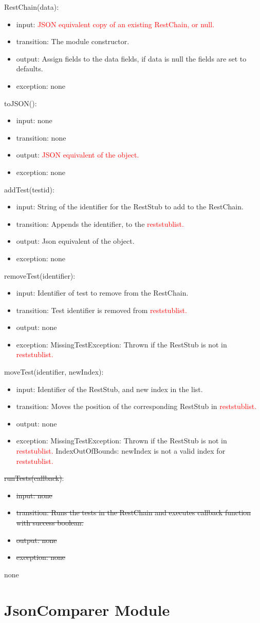 \documentclass[12pt, titlepage]{article}
\newcommand{\newAccessProgram}[5]{
	\noindent #1:
		\begin{itemize}
		    \item input: #2
			\item transition: #3
			\item output: #4
			\item exception: #5
		\end{itemize}
}
\newcommand{\oldAccessProgram}[5]{
	\noindent \sout{#1}:
		\begin{itemize}
		    \item \sout{input: #2}
			\item \sout{transition: #3}
			\item \sout{output: #4}
			\item \sout{exception: #5}
		\end{itemize}
}
\begin{document}
	{%
		\newAccessProgram{RestChain(data)}
			{%
				\textcolor{red}{JSON equivalent copy of an existing RestChain, or null.}
			}
			{%
				The module constructor.
			}
			{%
				Assign fields to the data fields, if data is null the fields are set to defaults.
			}
			{%
				none
			}
		\newAccessProgram{toJSON()}
			{%
				none
			}
			{%
				none
			}
			{%
				\textcolor{red}{JSON equivalent of the object.}
			}
			{%
				none
			}
			\newAccessProgram{addTest(testid)}
			{%
				String of the identifier for the RestStub to add to the RestChain.
			}
			{%
				Appends the identifier, to the \textcolor{red}{reststublist.}
			}
			{%
				Json equivalent of the object.
			}
			{%
				none
			}
		\newAccessProgram{removeTest(identifier)}
			{%
				Identifier of test to remove from the RestChain.
			}
			{%
				Test identifier is removed from \textcolor{red}{reststublist.}
			}
			{%
				none
			}
			{%
				MissingTestException: Thrown if the RestStub is not in \textcolor{red}{reststublist.}
			}
		\newAccessProgram{moveTest(identifier, newIndex)}
			{%
				Identifier of the RestStub, and new index in the list.
			}
			{%
				Moves the position of the corresponding RestStub in \textcolor{red}{reststublist.}
			}
			{%
				none
			}
			{%
				MissingTestException: Thrown if the RestStub is not in \textcolor{red}{reststublist.} 
				IndexOutOfBounds: newIndex is not a valid index for \textcolor{red}{reststublist.}
			}
		\oldAccessProgram{runTests(callback)}
			{%
				none
			}
			{%
				Runs the tests in the RestChain and executes callback function with success boolean.
			}
			{%
				none
			}
			{%
				none
			}
	}
	{%
		none
	}
	
\newpage

\section {JsonComparer Module}
\end{document}

